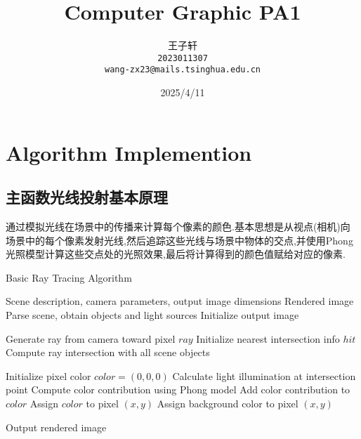 \documentclass[a4paper,twoside]{article}
\title{Computer Graphic PA1}
\author{
  王子轩\\
  \texttt{2023011307} \\
  \texttt{wang-zx23@mails.tsinghua.edu.cn} \\
}
\date{2025/4/11}
\begin{document}
\maketitle
\section{Algorithm Implemention}
\subsection{主函数光线投射基本原理}
通过模拟光线在场景中的传播来计算每个像素的颜色.基本思想是从视点(相机)向场景中的每个像素发射光线,然后追踪这些光线与场景中物体的交点,并使用Phong光照模型计算这些交点处的光照效果,最后将计算得到的颜色值赋给对应的像素.
\begin{algorithm}[H]
    \caption{Basic Ray Tracing Algorithm}
    \label{alg:raytracing}
    \begin{algorithmic}[1]
        \REQUIRE Scene description, camera parameters, output image dimensions
        \ENSURE Rendered image
        \STATE Parse scene, obtain objects and light sources
        \STATE Initialize output image
        
            \STATE Generate ray from camera toward pixel $ray$
            \STATE Initialize nearest intersection info $hit$
            \STATE Compute ray intersection with all scene objects
            
                \STATE Initialize pixel color $color = (0, 0, 0)$
                    \STATE Calculate light illumination at intersection point
                    \STATE Compute color contribution using Phong model
                    \STATE Add color contribution to $color$
                \ENDFOR
                \STATE Assign $color$ to pixel $(x, y)$
            \ELSE
                \STATE Assign background color to pixel $(x, y)$
            \ENDIF
        \ENDFOR
        
        \STATE Output rendered image
    \end{algorithmic}
\end{algorithm}
\end{document}

